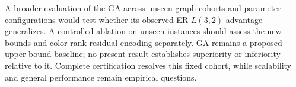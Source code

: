 A broader evaluation of the GA across unseen graph cohorts and parameter
configurations would test whether its observed ER $L(3,2)$ advantage
generalizes. A controlled ablation on unseen instances should assess the new bounds
and color-rank-residual encoding separately. GA remains a proposed
upper-bound baseline; no present result establishes superiority or
inferiority relative to it. Complete certification resolves this fixed
cohort, while scalability and general performance remain empirical questions.
